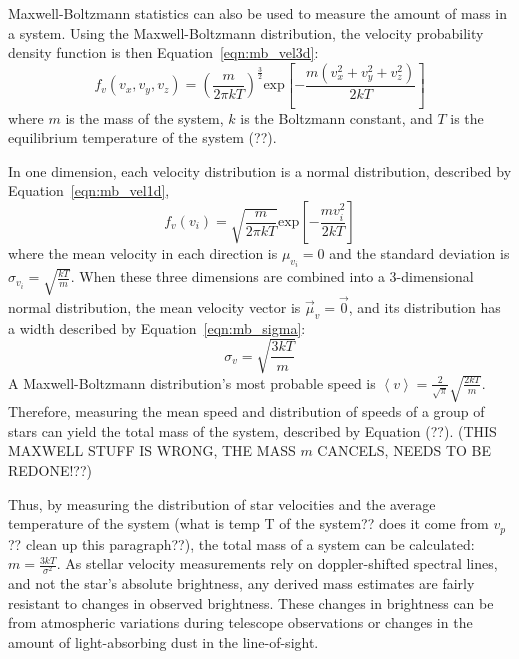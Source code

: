     Maxwell-Boltzmann statistics can also be used to measure the amount of mass in a system.
    Using the Maxwell-Boltzmann distribution, the velocity probability density function is then Equation~\ref{eqn:mb_vel3d}:
    \begin{equation}\label{eqn:mb_vel3d}
      f_v(v_x,v_y,v_z)= \left ( \frac{m}{2\pi k T} \right ) ^ { \frac{3}{2} } \text{exp} \left [ - \frac{m \left ( v_x^2 + v_y^2 + v_z^2 \right )}{2 k T} \right ]
    \end{equation}
    where $m$ is the mass of the system, $k$ is the Boltzmann constant, and $T$ is the equilibrium temperature of the system {\color{red}(??)}.
    
    In one dimension, each velocity distribution is a normal distribution, described by Equation~\ref{eqn:mb_vel1d},
    \begin{equation}\label{eqn:mb_vel1d}
      f_v(v_i) = \sqrt{ \frac{m}{2\pi k T} } \text{exp} \left [ - \frac{m v_i^2}{2kT} \right ]
    \end{equation}
    where the mean velocity in each direction is $\mu_{v_i} = 0$ and the standard deviation is $\sigma_{v_i} = \sqrt{\frac{kT}{m}}$.
    When these three dimensions are combined into a 3-dimensional normal distribution, the mean velocity vector is $\vec{\mu}_v = \vec{0}$, and its distribution has a width described by Equation~\ref{eqn:mb_sigma}:
    \begin{equation}\label{eqn:mb_sigma}
      \sigma_v = \sqrt{\frac{3kT}{m}}
    \end{equation}
    A Maxwell-Boltzmann distribution's most probable speed is $\left \langle v \right \rangle = \frac{2}{\sqrt{\pi}} \sqrt{\frac{2kT}{m}}$.
    Therefore, measuring the mean speed and distribution of speeds of a group of stars can yield the total mass of the system, described by Equation (??).
    {\color{red}(THIS MAXWELL STUFF IS WRONG, THE MASS $m$ CANCELS, NEEDS TO BE REDONE!??)}
    
    Thus, by measuring the distribution of star velocities and the average temperature of the system {\color{red}(what is temp T of the system??  does it come from $v_p$??  clean up this paragraph??)}, the total mass of a system can be calculated: $m = \frac{3kT}{\sigma^2}$.
    As stellar velocity measurements rely on doppler-shifted spectral lines, and not the star's absolute brightness, any derived mass estimates are fairly resistant to changes in observed brightness.
    These changes in brightness can be from atmospheric variations during telescope observations or changes in the amount of light-absorbing dust in the line-of-sight.

